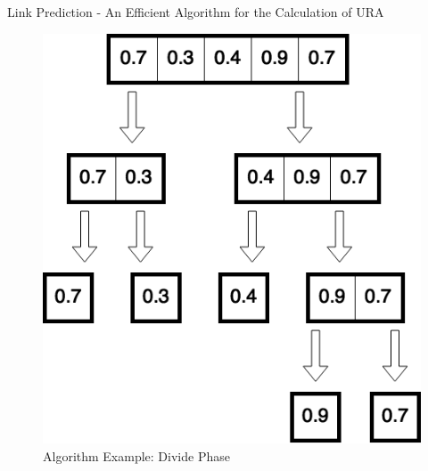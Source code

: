 \documentclass[9pt]{beamer}
\begin{document}
\begin{frame}{Link Prediction - An Efficient Algorithm for the Calculation of URA}


\begin{figure}
\includegraphics[scale = 0.35]{5_sample_divide.png}
\centering
\caption{Algorithm Example: Divide Phase}
\label{example}
\end{figure}


\end{frame}
\end{document}
